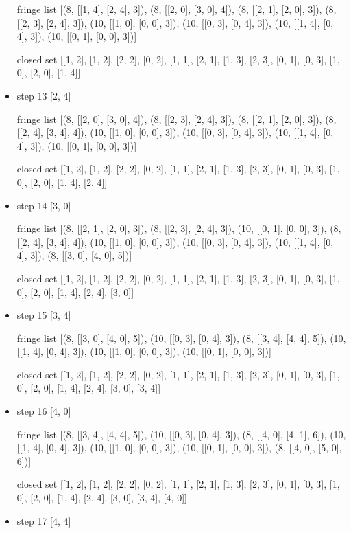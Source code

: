 \documentclass[aps,letterpaper,10pt]{revtex4}
\begin{document}
\begin{itemize}
fringe list
[(8, [[1, 4], [2, 4], 3]), (8, [[2, 0], [3, 0], 4]), (8, [[2, 1], [2, 0], 3]), (8, [[2, 3], [2, 4], 3]), (10, [[1, 0], [0, 0], 3]), (10, [[0, 3], [0, 4], 3]), (10, [[1, 4], [0, 4], 3]), (10, [[0, 1], [0, 0], 3])]


closed set
[[1, 2], [1, 2], [2, 2], [0, 2], [1, 1], [2, 1], [1, 3], [2, 3], [0, 1], [0, 3], [1, 0], [2, 0], [1, 4]]


\item step 13
[2, 4]


fringe list
[(8, [[2, 0], [3, 0], 4]), (8, [[2, 3], [2, 4], 3]), (8, [[2, 1], [2, 0], 3]), (8, [[2, 4], [3, 4], 4]), (10, [[1, 0], [0, 0], 3]), (10, [[0, 3], [0, 4], 3]), (10, [[1, 4], [0, 4], 3]), (10, [[0, 1], [0, 0], 3])]


closed set
[[1, 2], [1, 2], [2, 2], [0, 2], [1, 1], [2, 1], [1, 3], [2, 3], [0, 1], [0, 3], [1, 0], [2, 0], [1, 4], [2, 4]]


\item step 14
[3, 0]


fringe list
[(8, [[2, 1], [2, 0], 3]), (8, [[2, 3], [2, 4], 3]), (10, [[0, 1], [0, 0], 3]), (8, [[2, 4], [3, 4], 4]), (10, [[1, 0], [0, 0], 3]), (10, [[0, 3], [0, 4], 3]), (10, [[1, 
4], [0, 4], 3]), (8, [[3, 0], [4, 0], 5])]


closed set
[[1, 2], [1, 2], [2, 2], [0, 2], [1, 1], [2, 1], [1, 3], [2, 3], [0, 1], [0, 3], [1, 0], [2, 0], [1, 4], [2, 4], [3, 0]]


\item step 15
[3, 4]


fringe list
[(8, [[3, 0], [4, 0], 5]), (10, [[0, 3], [0, 4], 3]), (8, [[3, 4], [4, 4], 5]), (10, [[1, 4], [0, 4], 3]), (10, [[1, 0], [0, 0], 3]), (10, [[0, 1], [0, 0], 3])]


closed set
[[1, 2], [1, 2], [2, 2], [0, 2], [1, 1], [2, 1], [1, 3], [2, 3], [0, 1], [0, 3], [1, 0], [2, 0], [1, 4], [2, 4], [3, 0], [3, 4]]


\item step 16
[4, 0]


fringe list
[(8, [[3, 4], [4, 4], 5]), (10, [[0, 3], [0, 4], 3]), (8, [[4, 0], [4, 1], 6]), (10, [[1, 4], [0, 4], 3]), (10, [[1, 0], [0, 0], 3]), (10, [[0, 1], [0, 0], 3]), (8, [[4, 
0], [5, 0], 6])]


closed set
[[1, 2], [1, 2], [2, 2], [0, 2], [1, 1], [2, 1], [1, 3], [2, 3], [0, 1], [0, 3], [1, 0], [2, 0], [1, 4], [2, 4], [3, 0], [3, 4], [4, 0]]


\item step 17
[4, 4]



\end{itemize}
\end{document}
